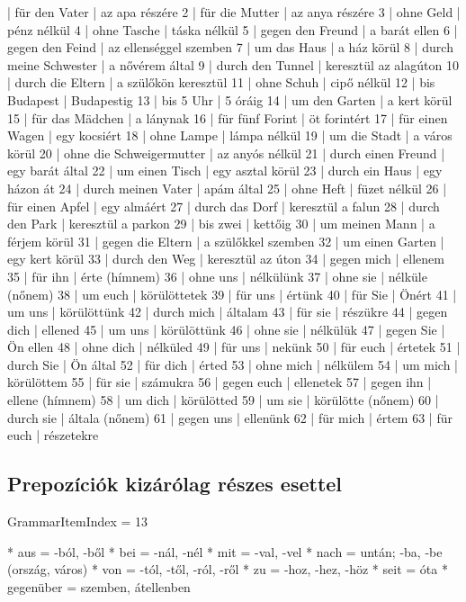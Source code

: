 \documentclass{article}
\newenvironment{desc}{\verbatim}{\endverbatim}
\newenvironment{exmp}{\verbatim}{\endverbatim}
\begin{document}
\begin{exmp}
1 | für den Vater | az apa részére
2 | für die Mutter | az anya részére
3 | ohne Geld | pénz nélkül
4 | ohne Tasche | táska nélkül
5 | gegen den Freund | a barát ellen
6 | gegen den Feind | az ellenséggel szemben
7 | um das Haus | a ház körül
8 | durch meine Schwester | a nővérem által
9 | durch den Tunnel | keresztül az alagúton
10 | durch die Eltern | a szülőkön keresztül
11 | ohne Schuh | cipő nélkül
12 | bis Budapest | Budapestig
13 | bis 5 Uhr | 5 óráig
14 | um den Garten | a kert körül
15 | für das Mädchen | a lánynak
16 | für fünf Forint | öt forintért
17 | für einen Wagen | egy kocsiért
18 | ohne Lampe | lámpa nélkül
19 | um die Stadt | a város körül
20 | ohne die Schweigermutter | az anyós nélkül
21 | durch einen Freund | egy barát által
22 | um einen Tisch | egy asztal körül
23 | durch ein Haus | egy házon át
24 | durch meinen Vater | apám által
25 | ohne Heft | füzet nélkül
26 | für einen Apfel | egy almáért
27 | durch das Dorf | keresztül a falun
28 | durch den Park | keresztül a parkon
29 | bis zwei | kettőig
30 | um meinen Mann | a férjem körül
31 | gegen die Eltern | a szülőkkel szemben
32 | um einen Garten | egy kert körül
33 | durch den Weg | keresztül az úton
34 | gegen mich | ellenem
35 | für ihn | érte (hímnem)
36 | ohne uns | nélkülünk
37 | ohne sie | nélküle (nőnem)
38 | um euch | körülöttetek
39 | für uns | értünk
40 | für Sie | Önért
41 | um uns | körülöttünk
42 | durch mich | általam
43 | für sie | részükre
44 | gegen dich | ellened
45 | um uns | körülöttünk
46 | ohne sie | nélkülük
47 | gegen Sie | Ön ellen
48 | ohne dich | nélküled
49 | für uns | nekünk
50 | für euch | értetek
51 | durch Sie | Ön által
52 | für dich | érted
53 | ohne mich | nélkülem
54 | um mich | körülöttem
55 | für sie | számukra
56 | gegen euch | ellenetek
57 | gegen ihn | ellene (hímnem)
58 | um dich | körülötted
59 | um sie | körülötte (nőnem)
60 | durch sie | általa (nőnem)
61 | gegen uns | ellenünk
62 | für mich | értem
63 | für euch | részetekre
\end{exmp}

\subsection{Prepozíciók kizárólag részes esettel}

GrammarItemIndex = 13

\begin{desc}
* aus = -ból, -ből
* bei = -nál, -nél
* mit = -val, -vel
* nach = untán; -ba, -be (ország, város)
* von = -tól, -től, -ról, -ről
* zu = -hoz, -hez, -höz
* seit = óta
* gegenüber = szemben, átellenben
\end{desc}
\end{document}
